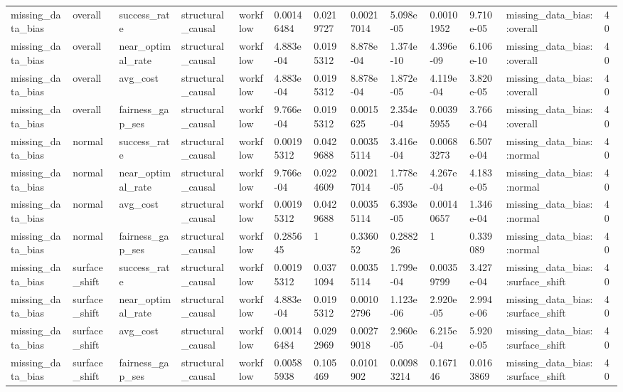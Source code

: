 \begin{tabular}{lllllllllllll}
missing\_data\_bias & overall & success\_rate & structural\_causal & workflow & 0.00146484 & 0.0219727 & 0.00217014 & 5.098e-05 & 0.00101952 & 9.710e-05 & missing\_data\_bias::overall & 40 \\
missing\_data\_bias & overall & near\_optimal\_rate & structural\_causal & workflow & 4.883e-04 & 0.0195312 & 8.878e-04 & 1.374e-10 & 4.396e-09 & 6.106e-10 & missing\_data\_bias::overall & 40 \\
missing\_data\_bias & overall & avg\_cost & structural\_causal & workflow & 4.883e-04 & 0.0195312 & 8.878e-04 & 1.872e-05 & 4.119e-04 & 3.820e-05 & missing\_data\_bias::overall & 40 \\
missing\_data\_bias & overall & fairness\_gap\_ses & structural\_causal & workflow & 9.766e-04 & 0.0195312 & 0.0015625 & 2.354e-04 & 0.00395955 & 3.766e-04 & missing\_data\_bias::overall & 40 \\
missing\_data\_bias & normal & success\_rate & structural\_causal & workflow & 0.00195312 & 0.0429688 & 0.00355114 & 3.416e-04 & 0.00683273 & 6.507e-04 & missing\_data\_bias::normal & 40 \\
missing\_data\_bias & normal & near\_optimal\_rate & structural\_causal & workflow & 9.766e-04 & 0.0224609 & 0.00217014 & 1.778e-05 & 4.267e-04 & 4.183e-05 & missing\_data\_bias::normal & 40 \\
missing\_data\_bias & normal & avg\_cost & structural\_causal & workflow & 0.00195312 & 0.0429688 & 0.00355114 & 6.393e-05 & 0.00140657 & 1.346e-04 & missing\_data\_bias::normal & 40 \\
missing\_data\_bias & normal & fairness\_gap\_ses & structural\_causal & workflow & 0.285645 & 1 & 0.336052 & 0.288226 & 1 & 0.339089 & missing\_data\_bias::normal & 40 \\
missing\_data\_bias & surface\_shift & success\_rate & structural\_causal & workflow & 0.00195312 & 0.0371094 & 0.00355114 & 1.799e-04 & 0.00359799 & 3.427e-04 & missing\_data\_bias::surface\_shift & 40 \\
missing\_data\_bias & surface\_shift & near\_optimal\_rate & structural\_causal & workflow & 4.883e-04 & 0.0195312 & 0.00102796 & 1.123e-06 & 2.920e-05 & 2.994e-06 & missing\_data\_bias::surface\_shift & 40 \\
missing\_data\_bias & surface\_shift & avg\_cost & structural\_causal & workflow & 0.00146484 & 0.0292969 & 0.00279018 & 2.960e-05 & 6.215e-04 & 5.920e-05 & missing\_data\_bias::surface\_shift & 40 \\
missing\_data\_bias & surface\_shift & fairness\_gap\_ses & structural\_causal & workflow & 0.00585938 & 0.105469 & 0.0101902 & 0.00983214 & 0.167146 & 0.0163869 & missing\_data\_bias::surface\_shift & 40 \\

\end{tabular}
